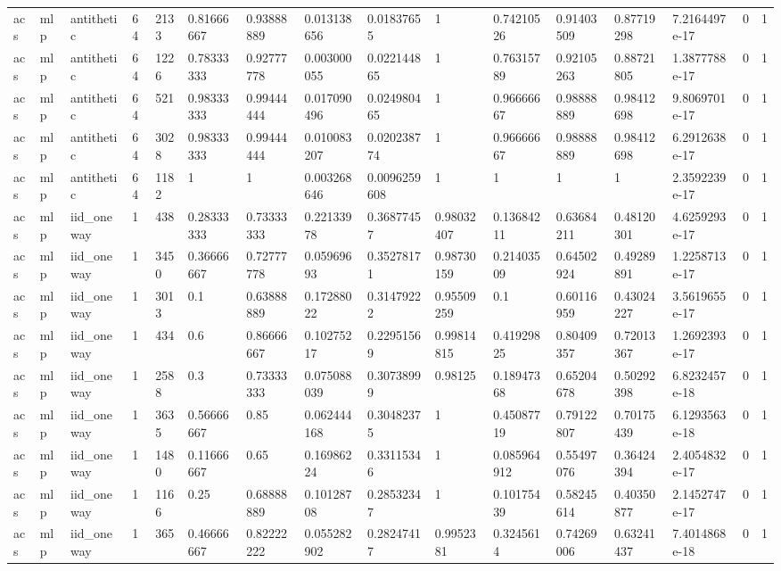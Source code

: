 \begin{tabular}{llllllllllllllll}
acs & mlp & antithetic & 64 & 2133 & 0.81666667 & 0.93888889 & 0.013138656 & 0.01837655 & 1 & 0.74210526 & 0.91403509 & 0.87719298 & 7.2164497e-17 & 0 & 1 \\
acs & mlp & antithetic & 64 & 1226 & 0.78333333 & 0.92777778 & 0.003000055 & 0.022144865 & 1 & 0.76315789 & 0.92105263 & 0.88721805 & 1.3877788e-17 & 0 & 1 \\
acs & mlp & antithetic & 64 & 521 & 0.98333333 & 0.99444444 & 0.017090496 & 0.024980465 & 1 & 0.96666667 & 0.98888889 & 0.98412698 & 9.8069701e-17 & 0 & 1 \\
acs & mlp & antithetic & 64 & 3028 & 0.98333333 & 0.99444444 & 0.010083207 & 0.020238774 & 1 & 0.96666667 & 0.98888889 & 0.98412698 & 6.2912638e-17 & 0 & 1 \\
acs & mlp & antithetic & 64 & 1182 & 1 & 1 & 0.003268646 & 0.0096259608 & 1 & 1 & 1 & 1 & 2.3592239e-17 & 0 & 1 \\
acs & mlp & iid\_oneway & 1 & 438 & 0.28333333 & 0.73333333 & 0.22133978 & 0.36877457 & 0.98032407 & 0.13684211 & 0.63684211 & 0.48120301 & 4.6259293e-17 & 0 & 1 \\
acs & mlp & iid\_oneway & 1 & 3450 & 0.36666667 & 0.72777778 & 0.05969693 & 0.35278171 & 0.98730159 & 0.21403509 & 0.64502924 & 0.49289891 & 1.2258713e-17 & 0 & 1 \\
acs & mlp & iid\_oneway & 1 & 3013 & 0.1 & 0.63888889 & 0.17288022 & 0.31479222 & 0.95509259 & 0.1 & 0.60116959 & 0.43024227 & 3.5619655e-17 & 0 & 1 \\
acs & mlp & iid\_oneway & 1 & 434 & 0.6 & 0.86666667 & 0.10275217 & 0.22951569 & 0.99814815 & 0.41929825 & 0.80409357 & 0.72013367 & 1.2692393e-17 & 0 & 1 \\
acs & mlp & iid\_oneway & 1 & 2588 & 0.3 & 0.73333333 & 0.075088039 & 0.30738999 & 0.98125 & 0.18947368 & 0.65204678 & 0.50292398 & 6.8232457e-18 & 0 & 1 \\
acs & mlp & iid\_oneway & 1 & 3635 & 0.56666667 & 0.85 & 0.062444168 & 0.30482375 & 1 & 0.45087719 & 0.79122807 & 0.70175439 & 6.1293563e-18 & 0 & 1 \\
acs & mlp & iid\_oneway & 1 & 1480 & 0.11666667 & 0.65 & 0.16986224 & 0.33115346 & 1 & 0.085964912 & 0.55497076 & 0.36424394 & 2.4054832e-17 & 0 & 1 \\
acs & mlp & iid\_oneway & 1 & 1166 & 0.25 & 0.68888889 & 0.10128708 & 0.28532347 & 1 & 0.10175439 & 0.58245614 & 0.40350877 & 2.1452747e-17 & 0 & 1 \\
acs & mlp & iid\_oneway & 1 & 365 & 0.46666667 & 0.82222222 & 0.055282902 & 0.28247417 & 0.9952381 & 0.3245614 & 0.74269006 & 0.63241437 & 7.4014868e-18 & 0 & 1 \\

\end{tabular}
